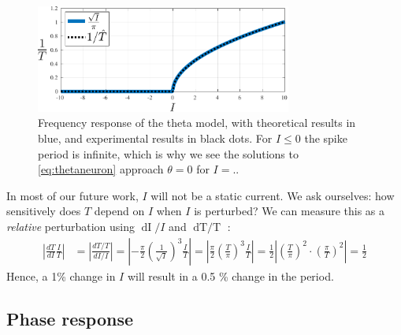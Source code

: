 \begin{figure}[ht]
\centering
\includegraphics[width = 0.75\textwidth]{../Figures/ThetaNeuronResponseToCurrentPeriod.pdf}
\caption{Frequency response of the theta model, with theoretical results in blue, and experimental results in black dots. For $I \leq 0$ the spike period is infinite, which is why we see the solutions to \eqref{eq:thetaneuron} approach $\theta = 0$ for $I = $..}
\label{fig:ThetaNeuronResponseToCurrentPeriod}
\end{figure}

In most of our future work, $I$ will not be a static current. We ask ourselves: how sensitively does $T$ depend on $I$ when $I$ is perturbed? We can measure this as a \textsl{relative} perturbation using $\mathop{dI}/I$ and $\mathop{dT/T}$ \cite{IntroductionModelingDynamics} :
\begin{align*}
\left| \frac{dT}{dI} \frac{I}{T} \right| &= \left| \frac{dT / T}{dI / I}\right| 
= \left|- \frac{\pi}{2} \left(\frac{1}{\sqrt{I}}\right)^3 \frac{I}{T} \right| 
= \left| \frac{\pi}{2} \left(\frac{T}{\pi}\right)^3 \frac{I}{T} \right| 
= \frac{1}{2} \left|\left(\frac{T}{\pi}\right)^2 \cdot \left(\frac{\pi}{T}\right)^2 \right| = \frac{1}{2}
\end{align*}
Hence, a 1\% change in $I$ will result in a 0.5 \% change in the period.


\subsection{Phase response} \label{sec:TheThetaNeuronModelPhaseResponse}



